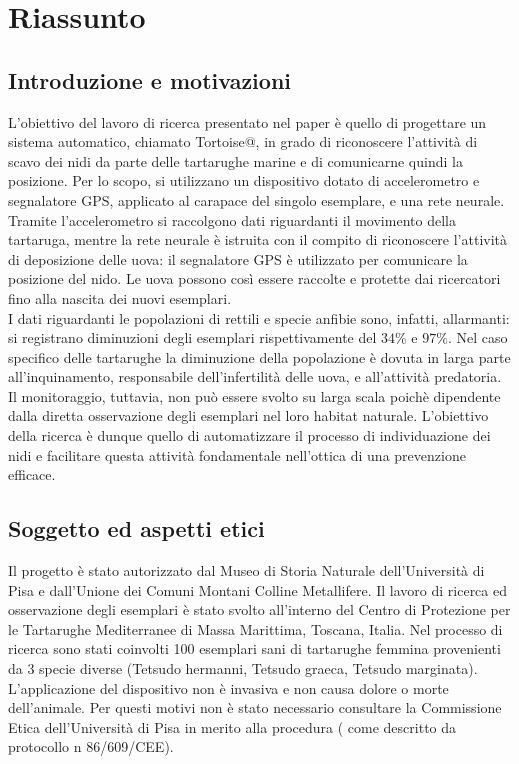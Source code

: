 \documentclass[12pt]{article}
\begin{document}
 	
 	\section{Riassunto}
 		\subsection{Introduzione e motivazioni}
 			L'obiettivo del lavoro di ricerca presentato nel paper è quello di progettare un sistema automatico, chiamato Tortoise@, in grado di riconoscere l'attività di scavo dei nidi da parte delle tartarughe marine e di comunicarne quindi la posizione.
 			Per lo scopo, si utilizzano un dispositivo dotato di accelerometro e segnalatore GPS, applicato al carapace del singolo esemplare, e una rete neurale.
 			Tramite l'accelerometro si raccolgono dati riguardanti il movimento della tartaruga, mentre la rete neurale è istruita con il compito di riconoscere l'attività di deposizione delle uova: il segnalatore GPS è utilizzato per comunicare la posizione del nido. Le uova possono così essere raccolte e protette dai ricercatori fino alla nascita dei nuovi esemplari.\\ 
 			I dati riguardanti le popolazioni di rettili e specie anfibie sono, infatti, allarmanti: si registrano diminuzioni degli esemplari rispettivamente del $34\%$ e $97\%$. Nel caso specifico delle tartarughe la diminuzione della popolazione è dovuta in larga parte all'inquinamento, responsabile dell'infertilità delle uova, e all'attività predatoria.\\  Il monitoraggio, tuttavia, non può essere svolto su larga scala poichè dipendente dalla diretta osservazione degli esemplari nel loro habitat naturale. L'obiettivo della ricerca è dunque quello di automatizzare il processo di individuazione dei nidi e facilitare questa attività fondamentale nell'ottica di una prevenzione efficace.
 		\subsection{Soggetto ed aspetti etici}
 			Il progetto è stato autorizzato dal Museo di Storia Naturale dell'Università di Pisa e dall'Unione dei Comuni Montani Colline Metallifere. Il lavoro di ricerca ed osservazione degli esemplari è stato svolto all'interno del Centro di Protezione per le Tartarughe Mediterranee di Massa Marittima, Toscana, Italia. Nel processo di ricerca sono stati coinvolti 100 esemplari sani di tartarughe femmina provenienti da 3 specie diverse (Tetsudo hermanni, Tetsudo graeca, Tetsudo marginata). L'applicazione del dispositivo non è invasiva e non causa dolore o morte dell'animale. Per questi motivi non è stato necessario consultare la Commissione Etica dell'Università di Pisa in merito alla procedura ( come descritto da protocollo n 86/609/CEE).
\end{document}
